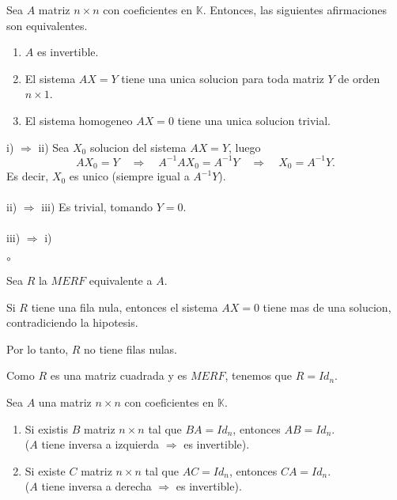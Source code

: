 \documentclass{article}
\theoremstyle{definition}
\theoremstyle{definition}
\theoremstyle{remark}
\begin{document}
\begin{teo}
  Sea $A$ matriz $n \times n$ con coeficientes en $\mathbb{K}$. Entonces, las siguientes afirmaciones son equivalentes. \begin{enumerate}[label=\textcolor{azulp2}{\roman*)}]
    \item $A$ es invertible. 
    \item El sistema $AX=Y$ tiene una unica solucion para toda matriz $Y$ de orden $ n \times 1$. 
    \item El sistema homogeneo $AX=0$ tiene una unica solucion trivial.
 \end{enumerate}
\end{teo}
\textcolor{azulp2}{i)} $\Rightarrow$ \textcolor{azulp2}{ii)} Sea $X_0$ solucion del sistema $AX=Y$, luego \[
  AX_0=Y \quad \Rightarrow \quad A^{-1}AX_0=A^{-1}Y\quad \Rightarrow \quad X_0=A^{-1}Y.
\]
Es decir, $X_0$ es unico (siempre igual a $A^{-1}Y$).\\\\
\textcolor{azulp2}{ii)} $\Rightarrow$ \textcolor{azulp2}{iii)} Es trivial, tomando $Y=0$.\\\\
\textcolor{azulp2}{iii)} $\Rightarrow$ \textcolor{azulp2}{i)}
\begin{list}{$\circ$}{}  
\item  Sea $R$ la $MERF$ equivalente a $A$.
\item Si $R$ tiene una fila nula, entonces el sistema $AX=0$ tiene mas de una solucion, contradiciendo la hipotesis.
\item Por lo tanto, $R$ no tiene filas nulas.
\item Como $R$ es una matriz cuadrada y es $MERF$, tenemos que $R=Id_n$.
\end{list}
\begin{corol}
  Sea $A$ una matriz $n \times n$ con coeficientes en $\mathbb{K}$. \begin{enumerate}[label=\textcolor{azulp2}{\arabic*.}]
    \item Si existis $B$ matriz $n \times n$ tal que $BA=Id_n$, entonces $AB=Id_n$. \\($A$ tiene inversa a izquierda $\Rightarrow$ es invertible). 
    \item Si existe $C$ matriz $n \times n$ tal que $AC=Id_n$, entonces $CA=Id_n$. \\($A$ tiene inversa a derecha $\Rightarrow$ es invertible).
 \end{enumerate}
\end{corol}
\end{document}
